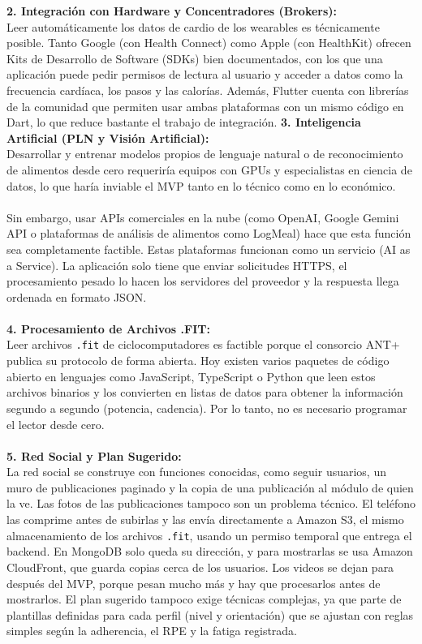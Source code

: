 \textbf{2. Integración con Hardware y Concentradores (Brokers):}\\
Leer automáticamente los datos de cardio de los wearables es técnicamente posible. Tanto Google (con Health Connect) como Apple (con HealthKit) ofrecen Kits de Desarrollo de Software (SDKs) bien documentados, con los que una aplicación puede pedir permisos de lectura al usuario y acceder a datos como la frecuencia cardíaca, los pasos y las calorías. Además, Flutter cuenta con librerías de la comunidad que permiten usar ambas plataformas con un mismo código en Dart, lo que reduce bastante el trabajo de integración.
\textbf{3. Inteligencia Artificial (PLN y Visión Artificial):}\\
Desarrollar y entrenar modelos propios de lenguaje natural o de reconocimiento de alimentos desde cero requeriría equipos con GPUs y especialistas en ciencia de datos, lo que haría inviable el MVP tanto en lo técnico como en lo económico.
\\\\
Sin embargo, usar APIs comerciales en la nube (como OpenAI, Google Gemini API o plataformas de análisis de alimentos como LogMeal) hace que esta función sea completamente factible. Estas plataformas funcionan como un servicio (AI as a Service). La aplicación solo tiene que enviar solicitudes HTTPS, el procesamiento pesado lo hacen los servidores del proveedor y la respuesta llega ordenada en formato JSON.
\\\\
\textbf{4. Procesamiento de Archivos .FIT:}\\
Leer archivos \texttt{.fit} de ciclocomputadores es factible porque el consorcio ANT+ publica su protocolo de forma abierta. Hoy existen varios paquetes de código abierto en lenguajes como JavaScript, TypeScript o Python que leen estos archivos binarios y los convierten en listas de datos para obtener la información segundo a segundo (potencia, cadencia). Por lo tanto, no es necesario programar el lector desde cero.
\\\\
\textbf{5. Red Social y Plan Sugerido:}\\
La red social se construye con funciones conocidas, como seguir usuarios, un muro de publicaciones paginado y la copia de una publicación al módulo de quien la ve. Las fotos de las publicaciones tampoco son un problema técnico. El teléfono las comprime antes de subirlas y las envía directamente a Amazon S3, el mismo almacenamiento de los archivos \texttt{.fit}, usando un permiso temporal que entrega el backend. En MongoDB solo queda su dirección, y para mostrarlas se usa Amazon CloudFront, que guarda copias cerca de los usuarios. Los videos se dejan para después del MVP, porque pesan mucho más y hay que procesarlos antes de mostrarlos. El plan sugerido tampoco exige técnicas complejas, ya que parte de plantillas definidas para cada perfil (nivel y orientación) que se ajustan con reglas simples según la adherencia, el RPE y la fatiga registrada.
